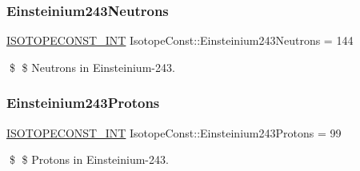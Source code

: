 \subsubsection{\texorpdfstring{Einsteinium243\+Neutrons}{Einsteinium243Neutrons}}
{\footnotesize\ttfamily \mbox{\hyperlink{group___isotope_const-_macros_ga5f18360b3e99483a35c32d789e62621c}{I\+S\+O\+T\+O\+P\+E\+C\+O\+N\+S\+T\+\_\+\+I\+NT}} Isotope\+Const\+::\+Einsteinium243\+Neutrons = 144}

\$ \$ Neutrons in Einsteinium-\/243. \mbox{\label{group___isotope_const-_einsteinium-_es243_ga76357ef7329d102702d8311f457b40ab}} 
\subsubsection{\texorpdfstring{Einsteinium243\+Protons}{Einsteinium243Protons}}
{\footnotesize\ttfamily \mbox{\hyperlink{group___isotope_const-_macros_ga5f18360b3e99483a35c32d789e62621c}{I\+S\+O\+T\+O\+P\+E\+C\+O\+N\+S\+T\+\_\+\+I\+NT}} Isotope\+Const\+::\+Einsteinium243\+Protons = 99}

\$ \$ Protons in Einsteinium-\/243. 